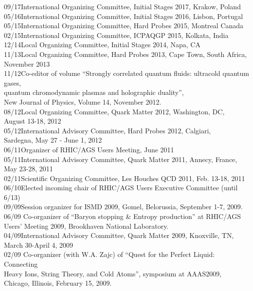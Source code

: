 \documentclass[11 pt]{article}
\begin{document}
\begin{tabbing}
09/17\>International Organizing Committee, Initial Stages 2017, Krakow, Poland\\
05/16\>International Organizing Committee, Initial Stages 2016, Lisbon, Portugal\\
05/15\>International Organizing Committee, Hard Probes 2015, Montreal Canada\\
02/15\>International Organizing Committee, ICPAQGP 2015, Kolkata, India\\
12/14\>Local Organizing Committee, Initial Stages 2014, Napa, CA\\
11/13\>Local Organizing Committee, Hard Probes 2013, Cape Town, South Africa, \\
\> November 2013\\
11/12\>Co-editor of volume ``Strongly correlated quantum fluids: ultracold quantum gases,\\ \> quantum chromodynamic plasmas and holographic duality'', \\\> New Journal of Physics, Volume 14, November 2012.\\
08/12\>Local Organizing Committee, Quark Matter 2012, Washington, DC, \\ \>August 13-18, 2012\\
05/12\>International Advisory Committee, Hard Probes 2012, Calgiari, \\ \>Sardegna, May 27 - June 1, 2012\\
06/11\>Organizer of RHIC/AGS Users Meeting, June 2011\\
05/11\>International Advisory Committee, Quark Matter 2011, Annecy, France,\\ \> May 23-28, 2011\\
02/11\>Scientific Organizing Committee, Les Houches QCD 2011, Feb. 13-18, 2011\\
06/10\>Elected incoming chair of RHIC/AGS Users Executive Committee (until 6/13)\\
09/09\>Session organizer for ISMD 2009, Gomel, Belorussia, September 1-7, 2009.\\
06/09 \>Co-organizer of ``Baryon stopping \& Entropy production'' at RHIC/AGS \\ \>Users' Meeting 2009, Brookhaven National Laboratory.\\
04/09\>International Advisory Committee, Quark Matter 2009, Knoxville, TN, \\ \>March 30-April 4, 2009\\
02/09\> Co-organizer (with W.A. Zajc) of ``Quest for the Perfect Liquid: Connecting\\ \> Heavy Ions, String Theory, and Cold Atoms'', symposium at AAAS2009, \\ \>Chicago, Illinois, February 15, 2009.\\

\end{tabbing}
\end{document}
